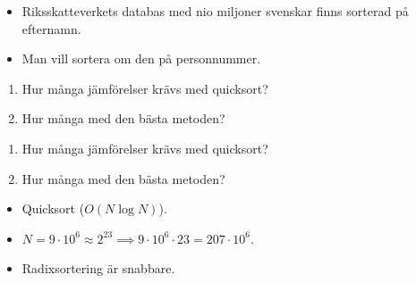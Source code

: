 \begin{frame}
  \begin{exercise}
    \begin{itemize}
      \item Riksskatteverkets databas med nio miljoner svenskar finns sorterad 
        på efternamn.
      \item Man vill sortera om den på personnummer.
    \end{itemize}
    \begin{enumerate}
      \item Hur många jämförelser krävs med quicksort?
      \item Hur många med den bästa metoden?
    \end{enumerate}
  \end{exercise}
\end{frame}

\begin{frame}
  \begin{exercise}
    \begin{enumerate}
      \item Hur många jämförelser krävs med quicksort?
      \item Hur många med den bästa metoden?
    \end{enumerate}
  \end{exercise}

  \begin{solution}
    \begin{itemize}
      \item Quicksort (\(O(N\log N)\)).
      \item \(N = 9\cdot 10^6\approx 2^{23}\implies 9\cdot 10^6\cdot 23 = 
        207\cdot 10^6\).
      \item Radixsortering är snabbare.
    \end{itemize}
  \end{solution}
\end{frame}


